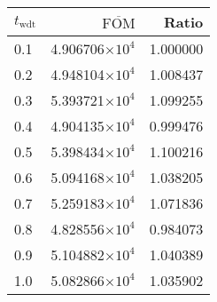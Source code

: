 \begin{tabular}{lrr}
\toprule
$t_{\mathrm{wdt}}$ & $\overline{\mathrm{FOM}}$ &    Ratio \\
\midrule
               0.1 &   4.906706$\times 10^{4}$ & 1.000000 \\
               0.2 &   4.948104$\times 10^{4}$ & 1.008437 \\
               0.3 &   5.393721$\times 10^{4}$ & 1.099255 \\
               0.4 &   4.904135$\times 10^{4}$ & 0.999476 \\
               0.5 &   5.398434$\times 10^{4}$ & 1.100216 \\
               0.6 &   5.094168$\times 10^{4}$ & 1.038205 \\
               0.7 &   5.259183$\times 10^{4}$ & 1.071836 \\
               0.8 &   4.828556$\times 10^{4}$ & 0.984073 \\
               0.9 &   5.104882$\times 10^{4}$ & 1.040389 \\
               1.0 &   5.082866$\times 10^{4}$ & 1.035902 \\
\bottomrule
\end{tabular}
